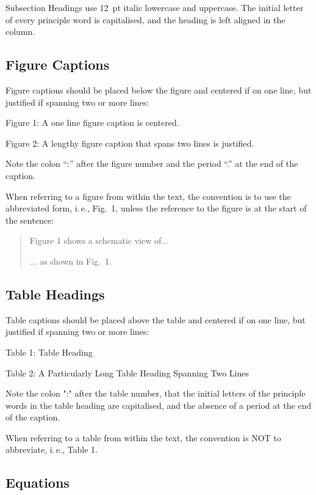 \documentclass[a4paper,
              ]{jacow}
\begin{document}
Subsection Headings use \SI{12}{pt} italic lowercase and uppercase.
The initial letter of every principle word is capitalised,
and the heading is left aligned in the column.

\subsection{Figure Captions}

Figure captions should be placed below the figure and
centered if on one line, but justified if spanning two or
more lines:
\begin{center}
	Figure 1: A one line figure caption is centered.
\end{center}
\begin{justify}
	Figure 2: A lengthy figure caption that spans 
	two lines is justified.
\end{justify}
Note the colon “:” after the figure number and the period
“.” at the end of the caption.

\newpage

When referring to a figure from within the text, the
convention is to use the abbreviated form, i.\,e., Fig.~1,
unless the reference to the figure is at the start of the sentence:
\begin{quote}
	Figure 1 shows a schematic view of...
	
	... as shown in Fig.~1.
\end{quote}

\subsection{Table Headings}

Table captions should be placed above the table and
centered if on one line, but justified if spanning two or
more lines:
\begin{center}
	Table 1: Table Heading
\end{center}
\begin{justify}
	Table 2: A Particularly Long Table Heading 
	Spanning Two Lines
\end{justify}

Note the colon ":" after the table number, that the initial
letters of the principle words in the table heading are
capitalised, and the absence of a period at the end of the
caption.

When referring to a table from within the text, the convention
is NOT to abbreviate, i.\,e., Table 1.

\subsection{Equations}
\end{document}
